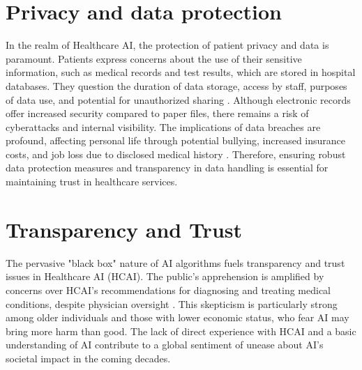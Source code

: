 \documentclass[paper=a4, fontsize=11pt]{scrartcl} %
\numberwithin{equation}{section} %
\numberwithin{figure}{section} %
\numberwithin{table}{section} %
\begin{document}
\section{Privacy and data protection}
In the realm of Healthcare AI, the protection of patient privacy and data is paramount. 
Patients express concerns about the use of their sensitive information, such as medical 
records and test results, which are stored in hospital databases. They question the duration 
of data storage, access by staff, purposes of data use, and potential for unauthorized sharing \cite{JayasundaraETHICALISSUESSURROUNDING}. 
Although electronic records offer increased security compared to paper files, there remains a 
risk of cyberattacks and internal visibility. The implications of data breaches are profound, 
affecting personal life through potential bullying, increased insurance costs, and job loss 
due to disclosed medical history \cite{Thapa2021PrecisionHealthData}. Therefore, ensuring robust data protection measures and 
transparency in data handling is essential for maintaining trust in healthcare services.


\section{Transparency and Trust}
The pervasive "black box" nature of AI algorithms fuels transparency and trust issues 
in Healthcare AI (HCAI). The public's apprehension is amplified by concerns over HCAI's 
recommendations for diagnosing and treating medical conditions, despite physician oversight \cite{esmaeilzadehPatientsPerceptionsHuman2021}. 
This skepticism is particularly strong among older individuals and those with lower economic 
status, who fear AI may bring more harm than good. The lack of direct experience with HCAI 
and a basic understanding of AI contribute to a global sentiment of unease about AI's societal 
impact in the coming decades.
\end{document}
